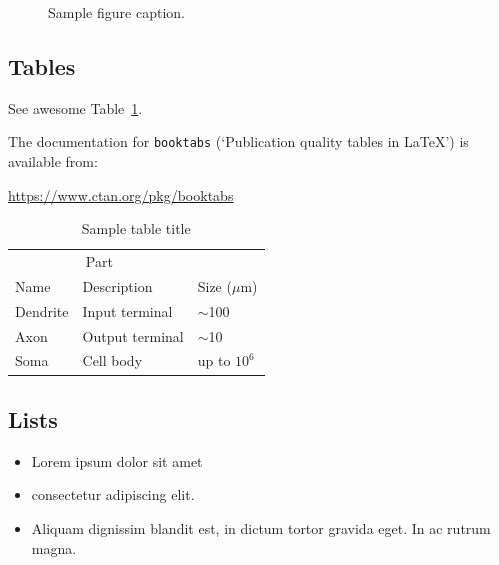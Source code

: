 \documentclass{article}
\begin{document}
\begin{figure}
	\centering
	\fbox{\rule[-.5cm]{4cm}{4cm} \rule[-.5cm]{4cm}{0cm}}
	\caption{Sample figure caption.}
	\label{fig:fig1}
\end{figure}

\subsection{Tables}
See awesome Table~\ref{tab:table}.

The documentation for \verb+booktabs+ (`Publication quality tables in LaTeX') is available from:
\begin{center}
	\url{https://www.ctan.org/pkg/booktabs}
\end{center}


\begin{table}
	\caption{Sample table title}
	\centering
	\begin{tabular}{lll}
		\toprule
		\multicolumn{2}{c}{Part}                   \\
		\cmidrule(r){1-2}
		Name     & Description     & Size ($\mu$m) \\
		\midrule
		Dendrite & Input terminal  & $\sim$100     \\
		Axon     & Output terminal & $\sim$10      \\
		Soma     & Cell body       & up to $10^6$  \\
		\bottomrule
	\end{tabular}
	\label{tab:table}
\end{table}

\subsection{Lists}
\begin{itemize}
	\item Lorem ipsum dolor sit amet
	\item consectetur adipiscing elit.
	\item Aliquam dignissim blandit est, in dictum tortor gravida eget. In ac rutrum magna.
\end{itemize}





\end{document}
